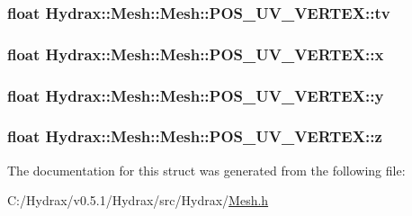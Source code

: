 \hypertarget{struct_hydrax_1_1_mesh_1_1_p_o_s___u_v___v_e_r_t_e_x_147a6e06dcf03330d3ff6803aba5c7d7}{
\subsubsection[{tv}]{\setlength{\rightskip}{0pt plus 5cm}float Hydrax::Mesh::Mesh::POS\_\-UV\_\-VERTEX::tv}}
\label{struct_hydrax_1_1_mesh_1_1_p_o_s___u_v___v_e_r_t_e_x_147a6e06dcf03330d3ff6803aba5c7d7}


\hypertarget{struct_hydrax_1_1_mesh_1_1_p_o_s___u_v___v_e_r_t_e_x_1bbf31bd696a79c1f51026fd5b31cbd2}{
\subsubsection[{x}]{\setlength{\rightskip}{0pt plus 5cm}float Hydrax::Mesh::Mesh::POS\_\-UV\_\-VERTEX::x}}
\label{struct_hydrax_1_1_mesh_1_1_p_o_s___u_v___v_e_r_t_e_x_1bbf31bd696a79c1f51026fd5b31cbd2}


\hypertarget{struct_hydrax_1_1_mesh_1_1_p_o_s___u_v___v_e_r_t_e_x_17aa16e34810db40b6b67e9aa52673d7}{
\subsubsection[{y}]{\setlength{\rightskip}{0pt plus 5cm}float Hydrax::Mesh::Mesh::POS\_\-UV\_\-VERTEX::y}}
\label{struct_hydrax_1_1_mesh_1_1_p_o_s___u_v___v_e_r_t_e_x_17aa16e34810db40b6b67e9aa52673d7}


\hypertarget{struct_hydrax_1_1_mesh_1_1_p_o_s___u_v___v_e_r_t_e_x_1cd321776804143d5d41a6efd7e708c2}{
\subsubsection[{z}]{\setlength{\rightskip}{0pt plus 5cm}float Hydrax::Mesh::Mesh::POS\_\-UV\_\-VERTEX::z}}
\label{struct_hydrax_1_1_mesh_1_1_p_o_s___u_v___v_e_r_t_e_x_1cd321776804143d5d41a6efd7e708c2}




The documentation for this struct was generated from the following file:\begin{CompactItemize}
\item 
C:/Hydrax/v0.5.1/Hydrax/src/Hydrax/\hyperlink{_mesh_8h}{Mesh.h}\end{CompactItemize}
